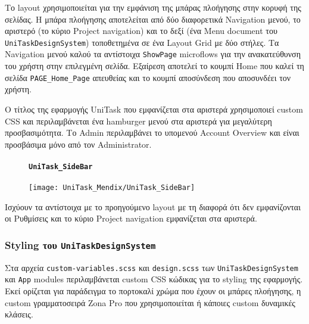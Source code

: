                 Το layout χρησιμοποιείται για την εμφάνιση της μπάρας πλοήγησης στην κορυφή της σελίδας. Η μπάρα πλοήγησης αποτελείται από δύο διαφορετικά Navigation μενού, το αριστερό (το κύριο Project navigation) και το δεξί (ένα Menu document του \texttt{UniTaskDesignSystem}) τοποθετημένα σε ένα Layout Grid με δύο στήλες. Τα Navigation μενού καλού τα αντίστοιχα \texttt{ShowPage} microflows για την ανακατεύθυνση του χρήστη στην επιλεγμένη σελίδα. Εξαίρεση αποτελεί το κουμπί {\Zona Home} που καλεί τη σελίδα \texttt{PAGE\_Home\_Page} απευθείας και το κουμπί {\Zonaa αποσύνδεση} που αποσυνδέει τον χρήστη.

                Ο τίτλος της εφαρμογής {\ZonaSB UniTask} που εμφανίζεται στα αριστερά χρησιμοποιεί custom CSS και περιλαμβάνεται ένα hamburger μενού στα αριστερά για μεγαλύτερη προσβασιμότητα. Το {\Zone Admin} περιλαμβάνει το υπομενού {\Zona Account Overview} και είναι προσβάσιμα μόνο από τον Administrator.

                \begin{figure}[H] \noindent
                    \paragraph{\texttt{UniTask\_SideBar}}
                    \begin{center}
                        \texttt{[image: UniTask\_Mendix/UniTask\_SideBar]}
                    \end{center}
                \end{figure}\textbf{}

                Ισχύουν τα αντίστοιχα με το προηγούμενο layout με τη διαφορά ότι δεν εμφανίζονται οι Ρυθμίσεις και το κύριο Project navigation εμφανίζεται στα αριστερά.

            \subsubsection{Styling του \texttt{UniTaskDesignSystem}}
                Στα αρχεία \texttt{custom-variables.scss} και \texttt{design.scss} των \texttt{UniTaskDesignSystem} και \texttt{App} modules περιλαμβάνεται custom CSS κώδικας για το styling της εφαρμογής. Εκεί ορίζεται για παράδειγμα το πορτοκαλί χρώμα που έχουν οι μπάρες πλοήγησης, η custom γραμματοσειρά Zona Pro που χρησιμοποιείται ή κάποιες custom δυναμικές κλάσεις.
